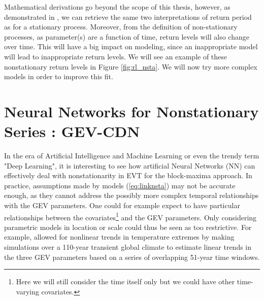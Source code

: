 Mathematical derivations go beyond the scope of this thesis, however, as demonstrated in \citet[Section 4.2]{ag_extremes_2013}, we can retrieve the same two interpretations of return period as for a stationary process. Moreover, from the definition of non-stationary processes, as parameter(s) are a function of time, return levels will also change over time. This will have a big impact on modeling, since an inappropriate model will lead to inappropriate return levels. We will see an example of these nonstationary return levels in Figure \ref{fig:rl_nsta}. 
We will now try more complex models in order to improve this fit. 


\section{Neural Networks for Nonstationary Series : GEV-CDN}\label{sec:gevcdn}

In the era of Artificial Intelligence and Machine Learning or even the trendy term "Deep Learning", it is interesting to see how artificial Neural Networks (NN) can effectively deal with nonstationarity in EVT for the block-maxima approach. 
In practice, assumptions made by models (\ref{eq:linknsta}) may not be accurate enough, as they cannot address the possibly more complex temporal relationships with the GEV parameters. One could for example expect to have particular relationships between the covariates\footnote{Here we will still consider the time itself only but we could have other time-varying covariates.} and the GEV parameters. Only considering parametric models in location or scale could thus be seen as too restrictive. For example, \citet{kharin_estimating_2005} allowed for nonlinear trends in temperature extremes by making simulations over a 110-year transient global climate to estimate linear trends in the three GEV parameters based on a series of overlapping 51-year time windows. 

